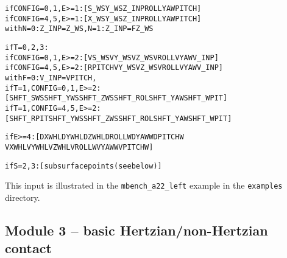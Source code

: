 \documentclass[12pt]{report}
\renewcommand{\magenta}[1]{}
\begin{document}
\begin{alltt}
% Information on the wheelset state (section \ref{sec:wheelset_geom}):

if CONFIG=0,1, E>=1: [ S\_WS    Y\_WS    Z\_INP  ROLL    YAW    PITCH    ]
if CONFIG=4,5, E>=1: [ X\_WS    Y\_WS    Z\_INP  ROLL    YAW    PITCH    ]
   with  N=0:\magenta{  } Z\_INP = Z\_WS,   N=1: Z\_INP = FZ\_WS

if T=0,2,3:
if CONFIG=0,1, E>=2: [ VS\_WS   VY\_WS   VZ\_WS  VROLL   VYAW   V\_INP    ]
if CONFIG=4,5, E>=2: [ RPITCH  VY\_WS   VZ\_WS  VROLL   VYAW   V\_INP    ]
   with  F=0\magenta{,3}: V\_INP = VPITCH, \magenta{F=1: V\_INP = FX\_WS, F=2: V\_INP = MY\_WS}
if T=1, CONFIG=0,1, E>=2: 
          [ SHFT\_SWS   SHFT\_YWS  SHFT\_ZWS  SHFT\_ROL  SHFT\_YAW  SHFT\_WPIT ]
if T=1, CONFIG=4,5, E>=2: 
          [ SHFT\_RPIT  SHFT\_YWS  SHFT\_ZWS  SHFT\_ROL  SHFT\_YAW  SHFT\_WPIT ]

% Information on flexible wheelset deviations (section \ref{sec:wheelset_geom}):

if E>=4:    [ DXWHL    DYWHL    DZWHL    DROLLW   DYAWW    DPITCHW 
              VXWHL    VYWHL    VZWHL    VROLLW   VYAWW    VPITCHW    ]

% Subsurface stress calculation (section \ref{sec:subsurf}):

if S=2,3: [ subsurface points (see below) ]
\end{alltt}
This input is illustrated in the {\tt mbench\_a22\_left} example in the
{\tt examples} directory.

\color{black}


\subsection{Module 3 -- basic Hertzian/non-Hertzian contact}
\end{document}
